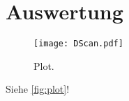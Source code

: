 \section{Auswertung}
\label{sec:Auswertung}

\begin{figure}
  \centering
  \texttt{[image: DScan.pdf]}
  \caption{Plot.}
  \label{fig:plot}
\end{figure}


Siehe \autoref{fig:plot}!
